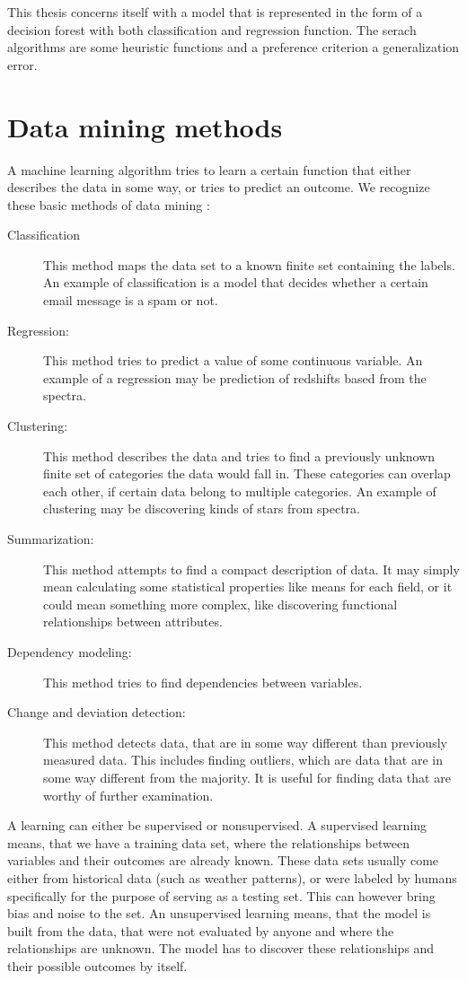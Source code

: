 \documentclass[thesis=B,english]{FITthesis}[2012/10/20]
\begin{document}
This thesis concerns itself with a model that is represented in the form of a decision forest with both classification and regression function. The serach algorithms are some heuristic functions and a preference criterion a generalization error.

\section{Data mining methods}
A machine learning algorithm tries to learn a certain function that either describes the data in some way, or tries to predict an outcome. We recognize these basic methods of data mining \cite{fayyad1996data}:
\begin{description}
\item [Classification] This method maps the data set to a known finite set containing the labels. An example of classification is a model that decides whether a certain email message is a spam or not.
\item [Regression:] This method tries to predict a value of some continuous variable. An example of a regression may be prediction of redshifts based from the spectra.
\item [Clustering:] This method describes the data and tries to find a previously unknown finite set of categories the data would fall in. These categories can overlap each other, if certain data belong to multiple categories. An example of clustering may be discovering kinds of stars from spectra.
\item [Summarization:] This method attempts to find a compact description of data. It may simply mean calculating some statistical properties like means for each field, or it could mean something more complex, like discovering functional relationships between attributes.
\item [Dependency modeling:] This method tries to find dependencies between variables. 
\item [Change and deviation detection:] This method detects data, that are in some way different than previously measured data. This includes finding outliers, which are data that are in some way different from the majority. It is useful for finding data that are worthy of further examination.
\end{description}

A learning can either be supervised or nonsupervised. A supervised learning means, that we have a training data set, where the relationships between variables and their outcomes are already known. These data sets usually come either from historical data (such as weather patterns), or were labeled by humans specifically for the purpose of serving as a testing set. This can however bring bias and noise to the set. An unsupervised learning means, that the model is built from the data, that were not evaluated by anyone and where the relationships are unknown. The model has to discover these relationships and their possible outcomes by itself.
\end{document}

